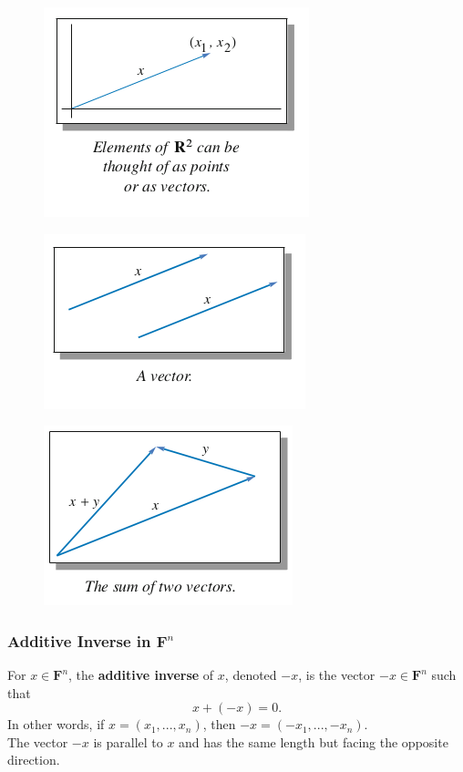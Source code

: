 \documentclass{article}
\begin{document}
	\begin{figure}[h!]
	\includegraphics{geometric-interpretation-of-vectors-1.png}
	\end{figure}
	
	\begin{figure}[h!]
	\includegraphics{geometric-interpretation-of-vectors-2.png}
	\end{figure}

	\begin{figure}[h!]
	\includegraphics{geometric-interpretation-of-vectors-3.png}
	\end{figure}

	\subsubsection{Additive Inverse in $\mathbf{F}^n$}
	For $x\in\mathbf{F}^n$, the \textbf{additive inverse} of $x$, denoted $-x$, is the vector $-x\in\mathbf{F}^n$ such that
	\begin{equation*}
		x + \left( -x \right) = 0.
	\end{equation*}
	In other words, if $x = \left( x_1, ..., x_n \right)$, then $-x = \left( -x_1, ..., -x_n \right)$.\\
	The vector $-x$ is parallel to $x$ and has the same length but facing the opposite direction.
\end{document}
